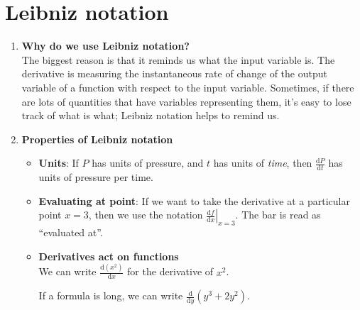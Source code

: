 \section{Leibniz notation}
\begin{enumerate}
    \item \textbf{Why do we use Leibniz notation?}\\
        \indent The biggest reason is that it reminds us what the input variable is. The derivative is measuring the instantaneous rate of change of the output variable of a function with respect to the input variable. Sometimes, if there are lots of quantities that have variables representing them, it's easy to lose track of what is what; Leibniz notation helps to remind us.
    \item \textbf{Properties of Leibniz notation}
        \begin{itemize}
            \item \textbf{Units}: If \(P\) has units of pressure, and \(t\) has units of \textit{time}, then \(\frac{\mathrm{d}P}{\mathrm{d}t}\) has units of pressure per time.
            \item \textbf{Evaluating at point}: If we want to take the derivative at a particular point \(x=3\), then we use the notation \(\left.\frac{\mathrm{d}f}{\mathrm{d}x}\right|_{x=3}\). The bar is read as ``evaluated at''.
            \item \textbf{Derivatives act on functions}\\
                \indent We can write \(\frac{\mathrm{d}(x^2)}{\mathrm{d}x}\) for the derivative of \(x^2\).\par
                If a formula is long, we can write \(\frac{\mathrm{d}}{\mathrm{d}y}(y^3+2y^2)\).
        \end{itemize}
\end{enumerate}

